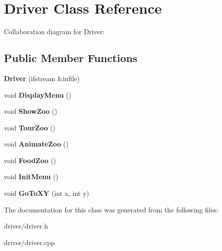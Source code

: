 \hypertarget{classDriver}{}\section{Driver Class Reference}
\label{classDriver}


Collaboration diagram for Driver\+:
\subsection*{Public Member Functions}
\begin{DoxyCompactItemize}
\item 
{\bfseries Driver} (ifstream \&infile)\hypertarget{classDriver_a0cb90a693e4ef6a2365366a2eba715c0}{}\label{classDriver_a0cb90a693e4ef6a2365366a2eba715c0}

\item 
void {\bfseries Display\+Menu} ()\hypertarget{classDriver_a56f5ca7386659854399999ffb6d8d043}{}\label{classDriver_a56f5ca7386659854399999ffb6d8d043}

\item 
void {\bfseries Show\+Zoo} ()\hypertarget{classDriver_ad216c7b9cea5f8bc17b7951fe77e3cfd}{}\label{classDriver_ad216c7b9cea5f8bc17b7951fe77e3cfd}

\item 
void {\bfseries Tour\+Zoo} ()\hypertarget{classDriver_aa56ed0eaa789f78765708e15032d6534}{}\label{classDriver_aa56ed0eaa789f78765708e15032d6534}

\item 
void {\bfseries Animate\+Zoo} ()\hypertarget{classDriver_a18056fbf7b54a5210184c1c2383612cd}{}\label{classDriver_a18056fbf7b54a5210184c1c2383612cd}

\item 
void {\bfseries Food\+Zoo} ()\hypertarget{classDriver_ab5b75860466c7288d95f7344f3ce9991}{}\label{classDriver_ab5b75860466c7288d95f7344f3ce9991}

\item 
void {\bfseries Init\+Menu} ()\hypertarget{classDriver_a5083f9512c066cc061a021a76c1d3ec6}{}\label{classDriver_a5083f9512c066cc061a021a76c1d3ec6}

\item 
void {\bfseries Go\+To\+XY} (int x, int y)\hypertarget{classDriver_a04dc7a5d7be6e80e87e2de15bb6e648d}{}\label{classDriver_a04dc7a5d7be6e80e87e2de15bb6e648d}

\end{DoxyCompactItemize}


The documentation for this class was generated from the following files\+:\begin{DoxyCompactItemize}
\item 
driver/driver.\+h\item 
driver/driver.\+cpp\end{DoxyCompactItemize}
